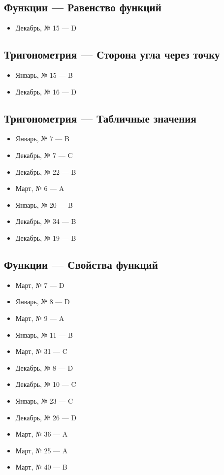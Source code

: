 \subsection*{Функции — Равенство функций}
\begin{itemize}
\item Декабрь, № 15 — D
\end{itemize}

\subsection*{Тригонометрия — Сторона угла через точку}
\begin{itemize}
\item Январь, № 15 — B
\item Декабрь, № 16 — D
\end{itemize}

\subsection*{Тригонометрия — Табличные значения}
\begin{itemize}
\item Январь, № 7 — B
\item Декабрь, № 7 — C
\item Декабрь, № 22 — B
\item Март, № 6 — A
\item Январь, № 20 — B
\item Декабрь, № 34 — B
\item Декабрь, № 19 — B
\end{itemize}

\subsection*{Функции — Свойства функций}
\begin{itemize}
\item Март, № 7 — D
\item Январь, № 8 — D
\item Март, № 9 — A
\item Январь, № 11 — B
\item Март, № 31 — C
\item Декабрь, № 8 — D
\item Декабрь, № 10 — C
\item Январь, № 23 — C
\item Декабрь, № 26 — D
\item Март, № 36 — A
\item Март, № 25 — A
\item Март, № 40 — B
\end{itemize}

